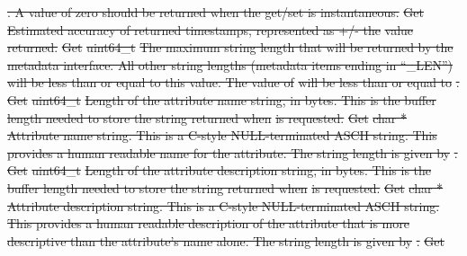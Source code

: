 \documentclass[12pt]{report} %
\providecommand{\DIFdeltex}[1]{{\protect\color{red}\sout{#1}}}                      %
\providecommand{\DIFdel}[1]{\texorpdfstring{\DIFdeltex{#1}}{}} %
\begin{document}
\DIFdel{. A value of zero should be returned when the get/set is instantaneous.}%
\DIFdel{Get     }%
\DIFdel{Estimated accuracy of returned timestamps, represented as +/- the }%
\DIFdel{value returned. }%
\DIFdel{Get     }%
\DIFdel{uint64_t   }%
\DIFdel{The maximum string length that will be returned by the metadata interface. All other string lengths (metadata items ending in ``_LEN'') will be less than or equal to this value.  The value of }%
\DIFdel{will be less than or equal to }%
\DIFdel{. }%
\DIFdel{Get     }%
\DIFdel{uint64_t   }%
\DIFdel{Length of the attribute name string, in bytes. This is the buffer length needed to store the string returned when }%
\DIFdel{is requested. }%
\DIFdel{Get     }%
\DIFdel{char *     }%
\DIFdel{Attribute name string. This is a C-style NULL-terminated ASCII string. This provides a human readable name for the attribute. The string length is given by }%
\DIFdel{. }%
\DIFdel{Get     }%
\DIFdel{uint64_t   }%
\DIFdel{Length of the attribute description string, in bytes. This is the buffer length needed to store the string returned when }%
\DIFdel{is requested. }%
\DIFdel{Get     }%
\DIFdel{char *     }%
\DIFdel{Attribute description string. This is a C-style NULL-terminated ASCII string. This provides a human readable description of the attribute that is more descriptive than the attribute's name alone. The string length is given by }%
\DIFdel{. }%
\DIFdel{Get     }%
\end{document}
